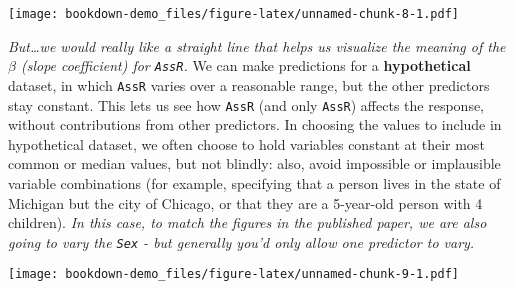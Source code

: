 \documentclass[]{book}
\newenvironment{Shaded}{\begin{snugshade}}{\end{snugshade}}
\newcommand{\CharTok}[1]{\textcolor[rgb]{0.31,0.60,0.02}{#1}}
\newcommand{\DataTypeTok}[1]{\textcolor[rgb]{0.13,0.29,0.53}{#1}}
\newcommand{\FloatTok}[1]{\textcolor[rgb]{0.00,0.00,0.81}{#1}}
\newcommand{\KeywordTok}[1]{\textcolor[rgb]{0.13,0.29,0.53}{\textbf{#1}}}
\newcommand{\NormalTok}[1]{#1}
\newcommand{\OperatorTok}[1]{\textcolor[rgb]{0.81,0.36,0.00}{\textbf{#1}}}
\newcommand{\StringTok}[1]{\textcolor[rgb]{0.31,0.60,0.02}{#1}}
\begin{document}
\texttt{[image: bookdown-demo\_files/figure-latex/unnamed-chunk-8-1.pdf]}

\emph{But\ldots{}we would really like a straight line that helps us visualize the meaning of the \(\beta\) (slope coefficient) for \texttt{AssR}.} We can make predictions for a \textbf{hypothetical} dataset, in which \texttt{AssR} varies over a reasonable range, but the other predictors stay constant. This lets us see how \texttt{AssR} (and only \texttt{AssR}) affects the response, without contributions from other predictors. In choosing the values to include in hypothetical dataset, we often choose to hold variables constant at their most common or median values, but not blindly: also, avoid impossible or implausible variable combinations (for example, specifying that a person lives in the state of Michigan but the city of Chicago, or that they are a 5-year-old person with 4 children). \emph{In this case, to match the figures in the published paper, we are also going to vary the \texttt{Sex} - but generally you'd only allow one predictor to vary.}

\begin{Shaded}
\end{Shaded}

\texttt{[image: bookdown-demo\_files/figure-latex/unnamed-chunk-9-1.pdf]}
\end{document}
